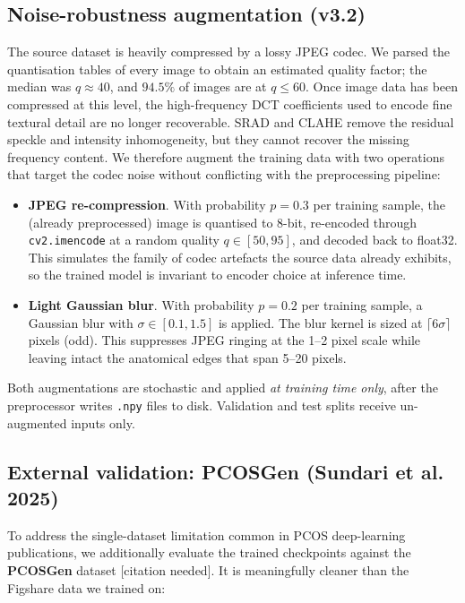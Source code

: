 \documentclass[10pt,a4paper]{article}
\begin{document}
\subsection{Noise-robustness augmentation (v3.2)}

The source dataset is heavily compressed by a lossy JPEG codec. We
parsed the quantisation tables of every image to obtain an estimated
quality factor; the median was $q \approx 40$, and $94.5\%$ of
images are at $q \leq 60$. Once image data has been compressed at
this level, the high-frequency DCT coefficients used to encode fine
textural detail are no longer recoverable. SRAD and CLAHE remove the
residual speckle and intensity inhomogeneity, but they cannot recover
the missing frequency content. We therefore augment the training data
with two operations that target the codec noise without conflicting
with the preprocessing pipeline:

\begin{itemize}
    \item \textbf{JPEG re-compression}. With probability $p = 0.3$
    per training sample, the (already preprocessed) image is
    quantised to 8-bit, re-encoded through \texttt{cv2.imencode} at a
    random quality $q \in [50, 95]$, and decoded back to float32.
    This simulates the family of codec artefacts the source data
    already exhibits, so the trained model is invariant to encoder
    choice at inference time.
    \item \textbf{Light Gaussian blur}. With probability $p = 0.2$
    per training sample, a Gaussian blur with $\sigma \in [0.1, 1.5]$
    is applied. The blur kernel is sized at $\lceil 6\sigma \rceil$
    pixels (odd). This suppresses JPEG ringing at the 1--2 pixel
    scale while leaving intact the anatomical edges that span
    5--20 pixels.
\end{itemize}

Both augmentations are stochastic and applied \emph{at training time
only}, after the preprocessor writes \texttt{.npy} files to disk.
Validation and test splits receive un-augmented inputs only.

\subsection{External validation: PCOSGen (Sundari et al. 2025)}

To address the single-dataset limitation common in PCOS deep-learning
publications, we additionally evaluate the trained checkpoints against
the \textbf{PCOSGen} dataset [citation needed]. It is meaningfully cleaner than
the Figshare data we trained on:
\end{document}
